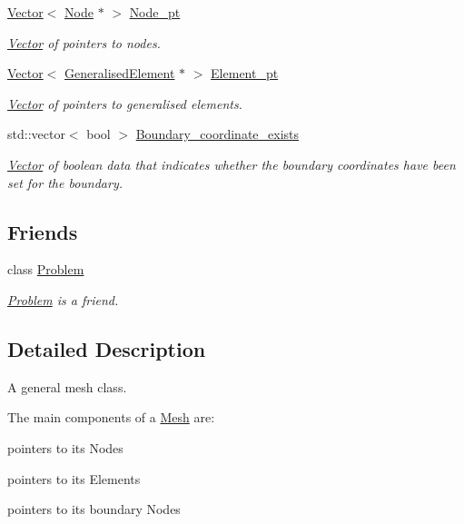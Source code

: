 \begin{DoxyCompactItemize}
\hyperlink{classoomph_1_1Vector}{Vector}$<$ \hyperlink{classoomph_1_1Node}{Node} $\ast$ $>$ \hyperlink{classoomph_1_1Mesh_a0a42111e7eb200e5831f8b73c018b7dc}{Node\+\_\+pt}
\begin{DoxyCompactList}\small\item\em \hyperlink{classoomph_1_1Vector}{Vector} of pointers to nodes. \end{DoxyCompactList}\item 
\hyperlink{classoomph_1_1Vector}{Vector}$<$ \hyperlink{classoomph_1_1GeneralisedElement}{Generalised\+Element} $\ast$ $>$ \hyperlink{classoomph_1_1Mesh_aca12acfe655a4d5c4a4eab4a7b970812}{Element\+\_\+pt}
\begin{DoxyCompactList}\small\item\em \hyperlink{classoomph_1_1Vector}{Vector} of pointers to generalised elements. \end{DoxyCompactList}\item 
std\+::vector$<$ bool $>$ \hyperlink{classoomph_1_1Mesh_a412a5051be9e81f0ba61bf85e5abc4a6}{Boundary\+\_\+coordinate\+\_\+exists}
\begin{DoxyCompactList}\small\item\em \hyperlink{classoomph_1_1Vector}{Vector} of boolean data that indicates whether the boundary coordinates have been set for the boundary. \end{DoxyCompactList}\end{DoxyCompactItemize}
\subsection*{Friends}
\begin{DoxyCompactItemize}
\item 
class \hyperlink{classoomph_1_1Mesh_acc081cc87e465ee811f25f9676550d09}{Problem}
\begin{DoxyCompactList}\small\item\em \hyperlink{classoomph_1_1Problem}{Problem} is a friend. \end{DoxyCompactList}\end{DoxyCompactItemize}


\subsection{Detailed Description}
A general mesh class. 

The main components of a \hyperlink{classoomph_1_1Mesh}{Mesh} are\+:
\begin{DoxyItemize}
\item pointers to its Nodes
\item pointers to its Elements
\item pointers to its boundary Nodes 
\end{DoxyItemize}

